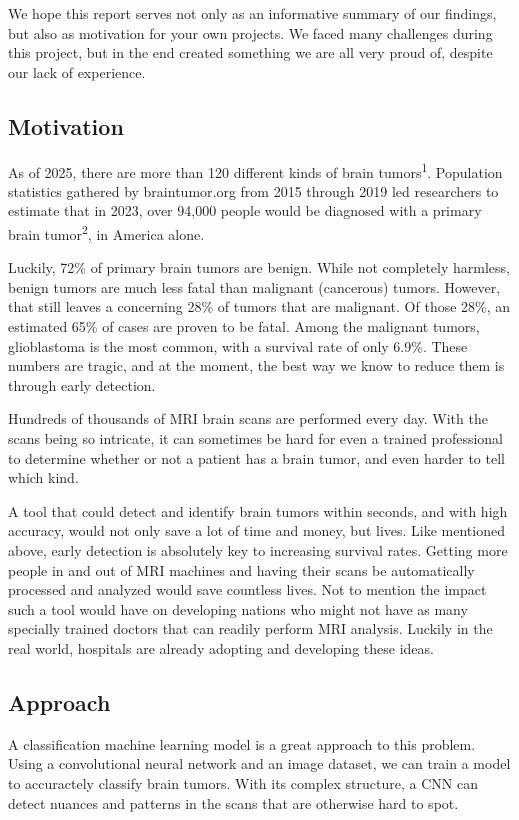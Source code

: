 \documentclass[conference]{IEEEtran}
\begin{document}
We hope this report serves not only as an informative summary of our findings, but also as motivation for your own projects. We faced many challenges during this project, but in the end created something we are all very proud of, despite our lack of experience.

\subsection{\large Motivation}

As of 2025, there are more than 120 different kinds of brain tumors\textsuperscript{1}. Population statistics gathered by braintumor.org from 2015 through 2019 led researchers to estimate that in 2023, over 94,000 people would be diagnosed with a primary brain tumor\textsuperscript{2}, in America alone. 

Luckily, 72\% of primary brain tumors are benign. While not completely harmless, benign tumors are much less fatal than malignant (cancerous) tumors. However, that still leaves a concerning 28\% of tumors that are malignant. Of those 28\%, an estimated 65\% of cases are proven to be fatal. Among the malignant tumors, glioblastoma is the most common, with a survival rate of only 6.9\%. These numbers are tragic, and at the moment, the best way we know to reduce them is through early detection.

Hundreds of thousands of MRI brain scans are performed every day. With the scans being so intricate, it can sometimes be hard for even a trained professional to determine whether or not a patient has a brain tumor, and even harder to tell which kind. 

A tool that could detect and identify brain tumors within seconds, and with high accuracy, would not only save a lot of time and money, but lives. Like mentioned above, early detection is absolutely key to increasing survival rates. Getting more people in and out of MRI machines and having their scans be automatically processed and analyzed would save countless lives. Not to mention the impact such a tool would have on developing nations who might not have as many specially trained doctors that can readily perform MRI analysis. Luckily in the real world, hospitals are already adopting and developing these ideas. 

\subsection{\large Approach}
A classification machine learning model is a great approach to this problem. Using a convolutional neural network and an image dataset, we can train a model to accuractely classify brain tumors. With its complex structure, a CNN can detect nuances and patterns in the scans that are otherwise hard to spot. 
\end{document}
